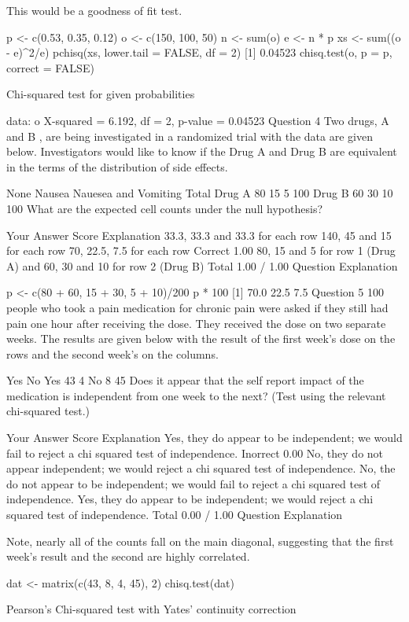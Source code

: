 This would be a goodness of fit test.

p <- c(0.53, 0.35, 0.12)
o <- c(150, 100, 50)
n <- sum(o)
e <- n * p
xs <- sum((o - e)^2/e)
pchisq(xs, lower.tail = FALSE, df = 2)
[1] 0.04523
chisq.test(o, p = p, correct = FALSE)

    Chi-squared test for given probabilities

data:  o
X-squared = 6.192, df = 2, p-value = 0.04523
Question 4
Two drugs, A and B , are being investigated in a randomized trial with the data are given below. Investigators would like to know if the Drug A and Drug B are equivalent in the terms of the distribution of side effects.

None	Nausea	Nauesea and Vomiting	Total
Drug A	80	15	5	100
Drug B	60	30	10	100
What are the expected cell counts under the null hypothesis?

Your Answer		Score	Explanation
33.3, 33.3 and 33.3 for each row			
140, 45 and 15 for each row			
70, 22.5, 7.5 for each row	Correct	1.00	
80, 15 and 5 for row 1 (Drug A) and 60, 30 and 10 for row 2 (Drug B)			
Total		1.00 / 1.00	
Question Explanation

p <- c(80 + 60, 15 + 30, 5 + 10)/200
p * 100
[1] 70.0 22.5  7.5
Question 5
100 people who took a pain medication for chronic pain were asked if they still had pain one hour after receiving the dose. They received the dose on two separate weeks. The results are given below with the result of the first week's dose on the rows and the second week's on the columns.

Yes	No
Yes	43	4
No	8	45
Does it appear that the self report impact of the medication is independent from one week to the next? (Test using the relevant chi-squared test.)

Your Answer		Score	Explanation
Yes, they do appear to be independent; we would fail to reject a chi squared test of independence.	Inorrect	0.00	
No, they do not appear independent; we would reject a chi squared test of independence.			
No, the do not appear to be independent; we would fail to reject a chi squared test of independence.			
Yes, they do appear to be independent; we would reject a chi squared test of independence.			
Total		0.00 / 1.00	
Question Explanation

Note, nearly all of the counts fall on the main diagonal, suggesting that the first week's result and the second are highly correlated.

dat <- matrix(c(43, 8, 4, 45), 2)
chisq.test(dat)

    Pearson's Chi-squared test with Yates' continuity correction


